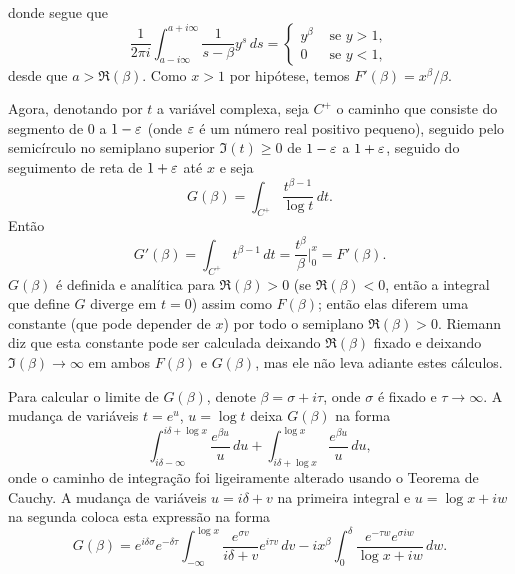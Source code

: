     donde segue que
    \begin{equation}
        \label{sec-1-14-(2)}
        \frac{1}{2\pi i} \int_{a -i\infty}^{a + i\infty} \frac{1}{s -\beta} y^s \, ds =
        \begin{cases}
            y^{\beta} &\text{ se } y > 1, \\
            0 &\text{ se } y < 1,
        \end{cases}
    \end{equation}
    desde que $a > \Re(\beta)$. Como $x>1$ por hipótese, temos $F'(\beta) = x^{\beta}/\beta$.
    
    Agora, denotando por $t$ a variável complexa, seja $C^{+}$ o caminho que consiste do segmento de $0$ a $1 - \varepsilon$ (onde $\varepsilon$ é um número real positivo pequeno), seguido pelo semicírculo no semiplano superior $\Im(t) \geq 0$ de $1 - \varepsilon$ a $1 + \varepsilon$, seguido do seguimento de reta de $1 + \varepsilon$ até $x$ e seja
    \begin{equation*}
        G(\beta) = \int_{C^{+}} \frac{t^{\beta -1}}{\log t} \, dt.
    \end{equation*}
    Então
    \begin{equation*}
        G'(\beta) = \int_{C^{+}} t^{\beta -1} \, dt = \frac{t^{\beta}}{\beta} \Big |_{0}^{x} = F'(\beta).
    \end{equation*}
    $G(\beta)$ é definida e analítica para $\Re(\beta) > 0$ (se $\Re(\beta) < 0$, então a integral que define $G$ diverge em $t=0$) assim como $F(\beta)$; então elas diferem uma constante (que pode depender de $x$) por todo o semiplano $\Re(\beta) > 0$. Riemann diz que esta constante pode ser calculada deixando $\Re(\beta)$ fixado e deixando $\Im(\beta) \to \infty$ em ambos $F(\beta)$ e $G(\beta)$, mas ele não leva adiante estes cálculos.
    
    Para calcular o limite de $G(\beta)$, denote $\beta = \sigma + i \tau$, onde $\sigma$ é fixado e $\tau \to \infty$. A mudança de variáveis $t = e^u$, $u = \log t$ deixa $G(\beta)$ na forma
    \begin{equation*}
        \int_{i\delta - \infty}^{i \delta + \log x} \frac{e^{\beta u}}{u} \, du + \int_{i\delta + \log x}^{\log x} \frac{e^{\beta u}}{u} \, du,
    \end{equation*}
    onde o caminho de integração foi ligeiramente alterado usando o Teorema de Cauchy. A mudança de variáveis $u = i\delta + v$ na primeira integral e $u = \log x + iw$ na segunda coloca esta expressão na forma
    \begin{equation*}
        G(\beta) = e^{i \delta \sigma} e^{- \delta \tau} \int_{- \infty}^{\log x} \frac{e^{\sigma v}}{i \delta + v} e^{i \tau v} \, dv - i x^{\beta} \int_{0}^{\delta} \frac{e^{-\tau w} e^{\sigma i w}}{\log x + iw} \, dw.
    \end{equation*}
    
